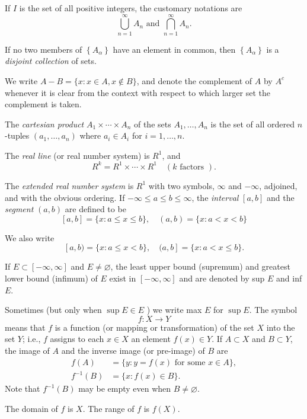 \documentclass[11pt]{article}
\begin{document}
If \(I\) is the set of all positive integers, the customary notations are
\[
\bigcup_{n=1}^{\infty} A_n \text { and } \bigcap_{n=1}^{\infty} A_n .
\]


If no two members of \(\left\{A_\alpha\right\}\) have an element in common, then \(\left\{A_\alpha\right\}\) is a \emph{disjoint collection} of sets.

We write \(A-B=\{x: x \in A, x \notin B\}\), and denote the complement of \(A\) by \(A^c\) whenever it is clear from the context with respect to which larger set the complement is taken.

The \emph{cartesian product} \(A_1 \times \cdots \times A_n\) of the sets \(A_1, \ldots, A_n\) is the set of all ordered \(n\)-tuples \(\left(a_1, \ldots, a_n\right)\) where \(a_i \in A_i\) for \(i=1, \ldots, n\).

The \emph{real line} (or real number system) is \(R^1\), and
\[
R^k=R^1 \times \cdots \times R^1 \quad(k \text { factors }).
\]

The \emph{extended real number system} is \(R^1\) with two symbols, \(\infty\) and \(-\infty\), adjoined, and with the obvious ordering. If \(-\infty \leq a \leq b \leq \infty\), the \emph{interval} \([a, b]\) and the \emph{segment} \((a, b)\) are defined to be
\[ [a, b]=\{x: a \leq x \leq b\}, \quad(a, b)=\{x: a<x<b\} \]

We also write
\[ [a, b)=\{x: a \leq x<b\}, \quad(a, b]=\{x: a<x \leq b\} .\]

If \(E \subset[-\infty, \infty]\) and \(E \neq \varnothing\), the least upper bound (supremum) and greatest lower bound (infimum) of \(E\) exist in \([-\infty, \infty]\) and are denoted by sup \(E\) and inf \(E\).

Sometimes (but only when \(\sup E \in E\) ) we write max \(E\) for \(\sup E\).
The symbol
\[
f: X \rightarrow Y
\]
means that \(f\) is a function (or mapping or transformation) of the set \(X\) into the set \(Y\); i.e., \(f\) assigns to each \(x \in X\) an element \(f(x) \in Y\). If \(A \subset X\) and \(B \subset Y\), the image of \(A\) and the inverse image (or pre-image) of \(B\) are
\[\begin{aligned}
f(A) & =\{y: y=f(x) \text { for some } x \in A\}, \\
f^{-1}(B) & =\{x: f(x) \in B\} .
\end{aligned}\]
Note that \(f^{-1}(B)\) may be empty even when \(B \neq \varnothing\).

The domain of \(f\) is \(X\). The range of \(f\) is \(f(X)\).
\end{document}
